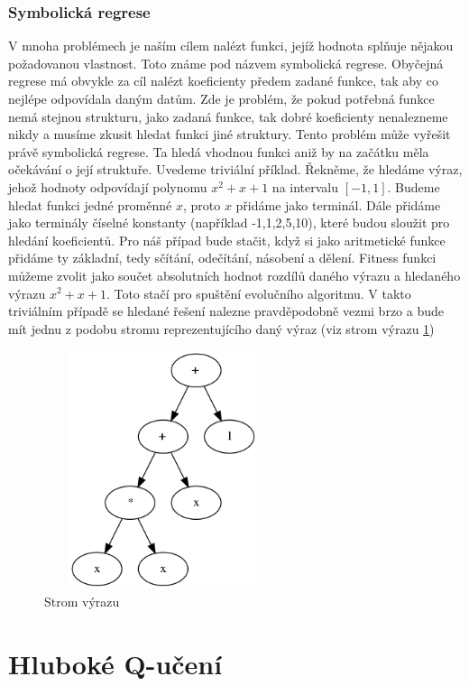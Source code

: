 \subsubsection{Symbolická regrese}
V mnoha problémech je naším cílem nalézt funkci, jejíž hodnota splňuje nějakou požadovanou vlastnost. Toto známe pod názvem symbolická regrese.
Obyčejná regrese má obvykle za cíl nalézt koeficienty předem zadané funkce, tak aby co nejlépe odpovídala daným datům.
Zde je problém, že pokud potřebná funkce nemá stejnou strukturu, jako zadaná funkce, tak dobré koeficienty nenalezneme nikdy a musíme zkusit hledat funkci jiné struktury.
Tento problém může vyřešit právě symbolická regrese. Ta hledá vhodnou funkci aniž by na začátku měla očekávání o její struktuře.
Uvedeme triviální příklad. Řekněme, že hledáme výraz, jehož hodnoty odpovídají polynomu $x^2+x+1$ na intervalu $[-1,1]$.
Budeme hledat funkci jedné proměnné $x$, proto $x$ přidáme jako terminál. Dále přidáme jako terminály číselné konstanty (například -1,1,2,5,10), které budou sloužit pro hledání koeficientů.
Pro náš případ bude stačit, když si jako aritmetické funkce přidáme ty základní, tedy sčítání, odečítání, násobení a dělení.
Fitness funkci můžeme zvolit jako součet absolutních hodnot rozdílů daného výrazu a hledaného výrazu $x^2+x+1$.
Toto stačí pro spuštění evolučního algoritmu. 
V takto triviálním případě se hledané řešení nalezne pravděpodobně vezmi brzo a bude mít jednu z podobu stromu reprezentujícího daný výraz (viz strom výrazu \ref{obr04:GrafFormule})


\begin{figure}[p]\centering
\includegraphics[width=70mm, height=70mm]{./Obrazky/formule_graph_2.png}
\caption{Strom výrazu}
\label{obr04:GrafFormule}
\end{figure}



\newpage
\section{Hluboké Q-učení}

